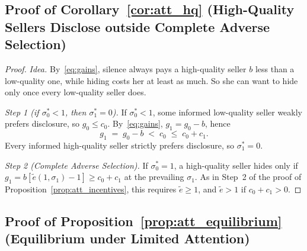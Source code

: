 \subsection*{Proof of Corollary~\ref{cor:att_hq} (High-Quality Sellers Disclose outside Complete Adverse Selection)}

\begin{proof}\upshape
\emph{Idea.} By~\eqref{eq:gains}, silence always pays a high-quality seller $b$ less than a low-quality one, while hiding costs her at least as much. So she can want to hide only once every low-quality seller does.

\emph{Step 1 (if $\sigma_0^*<1$, then $\sigma_1^*=0$).} If $\sigma_0^*<1$, some informed low-quality seller weakly prefers disclosure, so $g_0\le c_0$. By~\eqref{eq:gains}, $g_1=g_0-b$, hence
\begin{equation*}
    g_1\;=\;g_0-b\;<\;c_0\;\le\;c_0+c_1.
\end{equation*}
Every informed high-quality seller strictly prefers disclosure, so $\sigma_1^*=0$.

\emph{Step 2 (Complete Adverse Selection).} If $\sigma_0^*=1$, a high-quality seller hides only if $g_1=b[\tilde e(1,\sigma_1)-1]\ge c_0+c_1$ at the prevailing $\sigma_1$. As in Step~2 of the proof of Proposition~\ref{prop:att_incentives}, this requires $\tilde e\ge1$, and $\tilde e>1$ if $c_0+c_1>0$.
\end{proof}

\subsection*{Proof of Proposition~\ref{prop:att_equilibrium} (Equilibrium under Limited Attention)}

